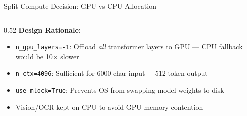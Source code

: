 \documentclass[aspectratio=169,10pt]{beamer}
\begin{document}
\begin{frame}{Split-Compute Decision: GPU vs CPU Allocation}
\begin{columns}[T]
\begin{column}{0.52\textwidth}
\vspace{4pt}
\footnotesize
\textbf{Design Rationale:}
\begin{itemize}\scriptsize
  \item \texttt{n\_gpu\_layers=-1}: Offload \textit{all} transformer layers to GPU --- CPU fallback would be 10$\times$ slower
  \item \texttt{n\_ctx=4096}: Sufficient for 6000-char input + 512-token output
  \item \texttt{use\_mlock=True}: Prevents OS from swapping model weights to disk
  \item Vision/OCR kept on CPU to avoid GPU memory contention
\end{itemize}
\end{column}
\end{columns}
\end{frame}
\end{document}
